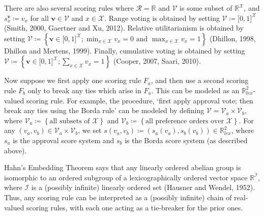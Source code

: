 \documentclass[
]{article}
\begin{document}
There are also several scoring rules where \(\mathcal{R} = \mathbb{R}\)
and \(\mathcal{V}\) is some subset of \(\mathbb{R}^{\mathcal{X}}\), and
\(s_{x}^{\mathbf{v}} ≔ v_{x}\) for all \(\mathbf{v} \in \mathcal{V}\)
and \(x \in \mathcal{X}\). Range voting is obtained by setting
\(\mathcal{V} ≔ \lbrack 0,1\rbrack^{\mathcal{X}}\) (Smith, 2000,
Gaertner and Xu, 2012). Relative utilitarianism is obtained by setting
\(\mathcal{V} ≔ \left\{ \mathbf{v} \in \lbrack 0,1\rbrack^{\mathcal{X}};\min_{x \in \mathcal{X}}v_{x} = 0\text{~and~}\max_{x \in \mathcal{X}}v_{x} = 1 \right\}\)
(Dhillon, 1998, Dhillon and Mertens, 1999). Finally, cumulative voting
is obtained by setting
\(\mathcal{V} ≔ \left\{ \mathbf{v} \in \lbrack 0,1\rbrack^{\mathcal{X}};\sum_{x \in \mathcal{X}}v_{x} = 1 \right\}\)
(Cooper, 2007, Saari, 2010).

Now suppose we first apply one scoring rule \(F_{a}\), and then use a
second scoring rule \(F_{b}\) only to break any ties which arise in
\(F_{a}\). This can be modeled as an \(\mathbb{R}_{lex}^{2}\)-valued
scoring rule. For example, the procedure, `first apply approval vote;
then break any ties using the Borda rule' can be modeled by defining
\(\mathcal{V} = \mathcal{V}_{a} \times \mathcal{V}_{b}\), where
\(\mathcal{V}_{a} ≔ \left\{ \text{all~subsets~of~}\mathcal{X} \right\}\)
and
\(\mathcal{V}_{b} ≔ \left\{ \text{all~preference~orders~over~}\mathcal{X} \right\}\).
For any
\(\left( v_{a},v_{b} \right) \in \mathcal{V}_{a} \times \mathcal{V}_{b}\),
we set
\(s\left( v_{a},v_{b} \right) ≔ \left( s_{a}\left( v_{a} \right),s_{b}\left( v_{b} \right) \right) \in \mathbb{R}_{lex}^{2}\),
where \(s_{a}\) is the approval score system and \(s_{b}\) is the Borda
score system (as described above).

Hahn's Embedding Theorem says that any linearly ordered abelian group is
isomorphic to an ordered subgroup of a lexicographically ordered vector
space \(\mathbb{R}^{\mathcal{I}}\), where \(\mathcal{I}\) is a (possibly
infinite) linearly ordered set (Hausner and Wendel, 1952). Thus, any
scoring rule can be interpreted as a (possibly infinite) chain of
real-valued scoring rules, with each one acting as a tie-breaker for the
prior ones.
\end{document}
